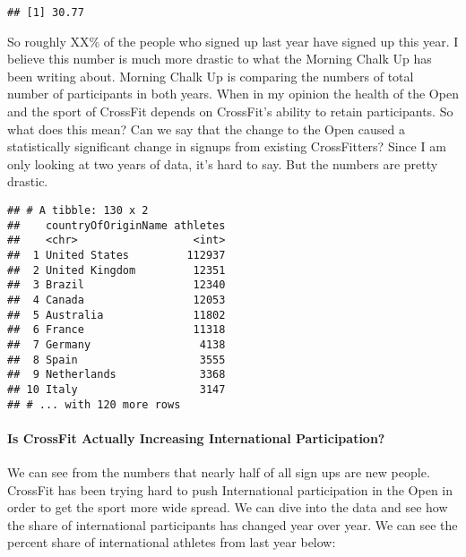 \documentclass[]{article}
\newenvironment{Shaded}{\begin{snugshade}}{\end{snugshade}}
\newcommand{\KeywordTok}[1]{\textcolor[rgb]{0.13,0.29,0.53}{\textbf{#1}}}
\newcommand{\DataTypeTok}[1]{\textcolor[rgb]{0.13,0.29,0.53}{#1}}
\newcommand{\DecValTok}[1]{\textcolor[rgb]{0.00,0.00,0.81}{#1}}
\newcommand{\StringTok}[1]{\textcolor[rgb]{0.31,0.60,0.02}{#1}}
\newcommand{\OperatorTok}[1]{\textcolor[rgb]{0.81,0.36,0.00}{\textbf{#1}}}
\newcommand{\NormalTok}[1]{#1}
\let\oldparagraph\paragraph
\renewcommand{\paragraph}[1]{\oldparagraph{#1}\mbox{}}
\begin{document}
\begin{verbatim}
## [1] 30.77
\end{verbatim}

So roughly XX\% of the people who signed up last year have signed up
this year. I believe this number is much more drastic to what the
Morning Chalk Up has been writing about. Morning Chalk Up is comparing
the numbers of total number of participants in both years. When in my
opinion the health of the Open and the sport of CrossFit depends on
CrossFit's ability to retain participants. So what does this mean? Can
we say that the change to the Open caused a statistically significant
change in signups from existing CrossFitters? Since I am only looking at
two years of data, it's hard to say. But the numbers are pretty drastic.

\begin{Shaded}
\end{Shaded}

\begin{verbatim}
## # A tibble: 130 x 2
##    countryOfOriginName athletes
##    <chr>                  <int>
##  1 United States         112937
##  2 United Kingdom         12351
##  3 Brazil                 12340
##  4 Canada                 12053
##  5 Australia              11802
##  6 France                 11318
##  7 Germany                 4138
##  8 Spain                   3555
##  9 Netherlands             3368
## 10 Italy                   3147
## # ... with 120 more rows
\end{verbatim}

\paragraph{Is CrossFit Actually Increasing International
Participation?}\label{is-crossfit-actually-increasing-international-participation}

We can see from the numbers that nearly half of all sign ups are new
people. CrossFit has been trying hard to push International
participation in the Open in order to get the sport more wide spread. We
can dive into the data and see how the share of international
participants has changed year over year. We can see the percent share of
international athletes from last year below:
\end{document}
